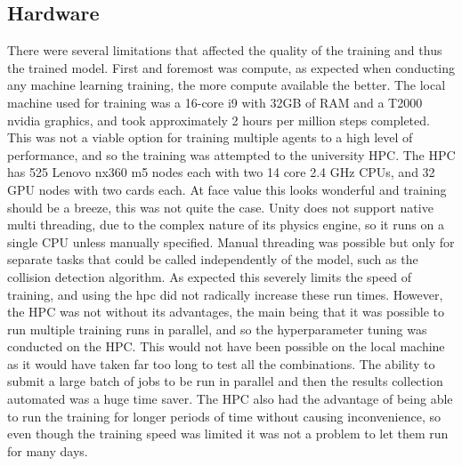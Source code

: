 \subsection{Hardware}\label{sec:hardware_evaluation}
There were several limitations that affected the quality of the training and thus the trained model. First and foremost was compute, as expected when conducting any machine learning training, the more compute available the better. The local machine used for training was a 16-core i9 with 32GB of RAM and a T2000 nvidia graphics, and took approximately 2 hours per million steps completed. This was not a viable option for training multiple agents to a high level of performance, and so the training was attempted to the university HPC. The HPC has 525 Lenovo nx360 m5 nodes each with two 14 core 2.4 GHz CPUs, and 32 GPU nodes with two cards each. At face value this looks wonderful and training should be a breeze, this was not quite the case. Unity does not support native multi threading, due to the complex nature of its physics engine, so it runs on a single CPU unless manually specified. Manual threading was possible but only for separate tasks that could be called independently of the model, such as the collision detection algorithm. As expected this severely limits the speed of training, and using the hpc did not radically increase these run times.
However, the HPC was not without its advantages, the main being that it was possible to run multiple training runs in parallel, and so the hyperparameter tuning was conducted on the HPC. This would not have been possible on the local machine as it would have taken far too long to test all the combinations. The ability to submit a large batch of jobs to be run in parallel and then the results collection automated was a huge time saver. The HPC also had the advantage of being able to run the training for longer periods of time without causing inconvenience, so even though the training speed was limited it was not a problem to let them run for many days. 







